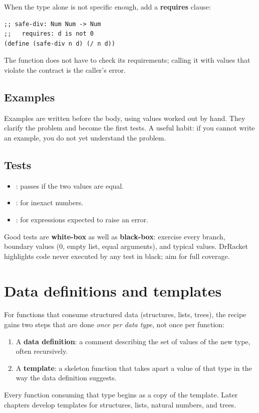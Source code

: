 When the type alone is not specific enough, add a \textbf{requires} clause:
\begin{lstlisting}[style=racket]
;; safe-div: Num Num -> Num
;;   requires: d is not 0
(define (safe-div n d) (/ n d))
\end{lstlisting}
The function does not have to check its requirements; calling it with values
that violate the contract is the caller's error.

\subsection{Examples}
Examples are written before the body, using values worked out by hand. They
clarify the problem and become the first tests. A useful habit: if you cannot
write an example, you do not yet understand the problem.

\subsection{Tests}
\begin{itemize}
  \item {}: passes if the two values are equal.
  \item {}: for inexact numbers.
  \item {}: for expressions expected to raise an error.
\end{itemize}
Good tests are \textbf{white-box} as well as \textbf{black-box}: exercise every
 branch, boundary values (0, empty list, equal arguments),
and typical values. DrRacket highlights code never executed by any test in
black; aim for full coverage.

\section{Data definitions and templates}

For functions that consume structured data (structures, lists, trees), the
recipe gains two steps that are done \emph{once per data type}, not once per
function:
\begin{enumerate}
  \item A \textbf{data definition}: a comment describing the set of values of the new type, often recursively.
  \item A \textbf{template}: a skeleton function that takes apart a value of that type in the way the data definition suggests.
\end{enumerate}
Every function consuming that type begins as a copy of the template. Later
chapters develop templates for structures, lists, natural numbers, and trees.

